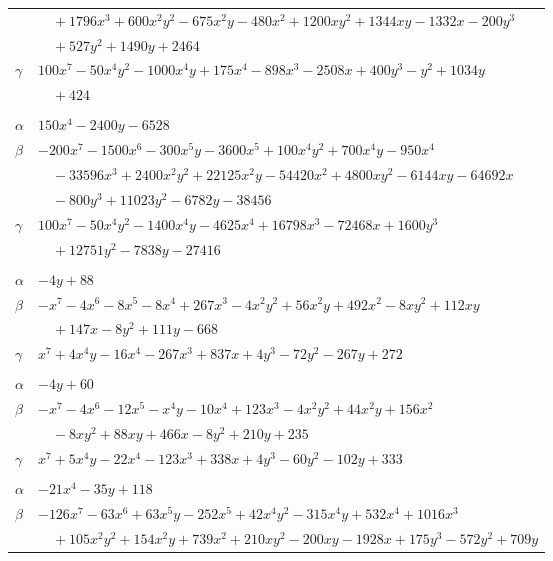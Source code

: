 \documentclass[11pt]{article}
\begin{document}
\begin{longtable}{@{}ll@{}}
 & $\quad +1796x^{3}+600x^{2}y^{2}-675x^{2}y-480x^{2}+1200xy^{2}+1344xy-1332x-200y^{3}$\\
 & $\quad +527y^{2}+1490y+2464$\\
$\gamma$ & $100x^{7}-50x^{4}y^{2}-1000x^{4}y+175x^{4}-898x^{3}-2508x+400y^{3}-y^{2}+1034y$\\
 & $\quad +424$\\
\addlinespace[3pt]
\multicolumn{2}{@{}l}{$\{i,j\}=\{66,82\}$, $k_{ij}=2^{6}\cdot 3^{5}$}\\
$\alpha$ & $150x^{4}-2400y-6528$\\
$\beta$ & $-200x^{7}-1500x^{6}-300x^{5}y-3600x^{5}+100x^{4}y^{2}+700x^{4}y-950x^{4}$\\
 & $\quad -33596x^{3}+2400x^{2}y^{2}+22125x^{2}y-54420x^{2}+4800xy^{2}-6144xy-64692x$\\
 & $\quad -800y^{3}+11023y^{2}-6782y-38456$\\
$\gamma$ & $100x^{7}-50x^{4}y^{2}-1400x^{4}y-4625x^{4}+16798x^{3}-72468x+1600y^{3}$\\
 & $\quad +12751y^{2}-7838y-27416$\\
\addlinespace[3pt]
\multicolumn{2}{@{}l}{$\{i,j\}=\{67,69\}$, $k_{ij}=2^{4}\cdot 5\cdot 11$}\\
$\alpha$ & $-4y+88$\\
$\beta$ & $-x^{7}-4x^{6}-8x^{5}-8x^{4}+267x^{3}-4x^{2}y^{2}+56x^{2}y+492x^{2}-8xy^{2}+112xy$\\
 & $\quad +147x-8y^{2}+111y-668$\\
$\gamma$ & $x^{7}+4x^{4}y-16x^{4}-267x^{3}+837x+4y^{3}-72y^{2}-267y+272$\\
\addlinespace[3pt]
\multicolumn{2}{@{}l}{$\{i,j\}=\{67,70\}$, $k_{ij}=2^{8}$}\\
$\alpha$ & $-4y+60$\\
$\beta$ & $-x^{7}-4x^{6}-12x^{5}-x^{4}y-10x^{4}+123x^{3}-4x^{2}y^{2}+44x^{2}y+156x^{2}$\\
 & $\quad -8xy^{2}+88xy+466x-8y^{2}+210y+235$\\
$\gamma$ & $x^{7}+5x^{4}y-22x^{4}-123x^{3}+338x+4y^{3}-60y^{2}-102y+333$\\
\addlinespace[3pt]
\multicolumn{2}{@{}l}{$\{i,j\}=\{67,72\}$, $k_{ij}=2^{4}\cdot 3\cdot 11$}\\
$\alpha$ & $-21x^{4}-35y+118$\\
$\beta$ & $-126x^{7}-63x^{6}+63x^{5}y-252x^{5}+42x^{4}y^{2}-315x^{4}y+532x^{4}+1016x^{3}$\\
 & $\quad +105x^{2}y^{2}+154x^{2}y+739x^{2}+210xy^{2}-200xy-1928x+175y^{3}-572y^{2}+709y$\\

\end{longtable}
\end{document}
